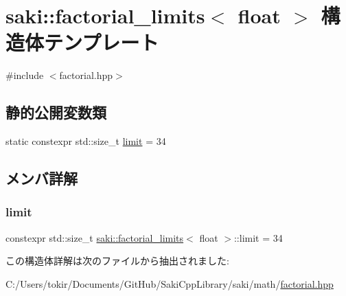 \hypertarget{structsaki_1_1factorial__limits_3_01float_01_4}{}\section{saki\+:\+:factorial\+\_\+limits$<$ float $>$ 構造体テンプレート}
\label{structsaki_1_1factorial__limits_3_01float_01_4}


{\ttfamily \#include $<$factorial.\+hpp$>$}

\subsection*{静的公開変数類}
\begin{DoxyCompactItemize}
\item 
static constexpr std\+::size\+\_\+t \mbox{\hyperlink{structsaki_1_1factorial__limits_3_01float_01_4_a795a72bf3f23a066cae41c5d3a0941db}{limit}} = 34
\end{DoxyCompactItemize}


\subsection{メンバ詳解}
\mbox{\label{structsaki_1_1factorial__limits_3_01float_01_4_a795a72bf3f23a066cae41c5d3a0941db}} 
\subsubsection{\texorpdfstring{limit}{limit}}
{\footnotesize\ttfamily constexpr std\+::size\+\_\+t \mbox{\hyperlink{structsaki_1_1factorial__limits}{saki\+::factorial\+\_\+limits}}$<$ float $>$\+::limit = 34\hspace{0.3cm}{\ttfamily [static]}}



この構造体詳解は次のファイルから抽出されました\+:\begin{DoxyCompactItemize}
\item 
C\+:/\+Users/tokir/\+Documents/\+Git\+Hub/\+Saki\+Cpp\+Library/saki/math/\mbox{\hyperlink{factorial_8hpp}{factorial.\+hpp}}\end{DoxyCompactItemize}
